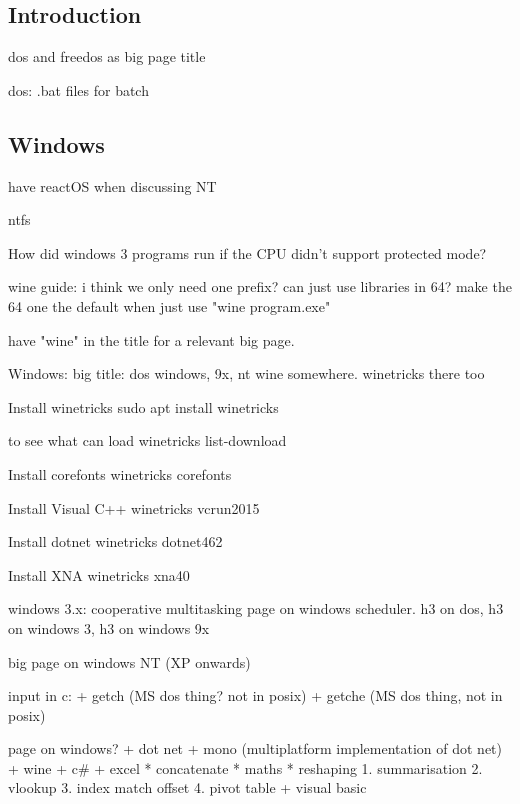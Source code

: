 
\subsection{Introduction}

dos and freedos as big page title

dos: .bat files for batch



\subsection{Windows}

have reactOS when discussing NT

ntfs

How did windows 3 programs run if the CPU didn't support protected mode?

wine guide: i think we only need one prefix? can just use libraries in 64? make the 64 one the default when just use "wine program.exe"

have "wine" in the title for a relevant big page.

Windows: big title: dos windows, 9x, nt
wine somewhere. winetricks there too

Install winetricks
sudo apt install winetricks

to see what can load
winetricks list-download

Install corefonts
winetricks corefonts

Install Visual C++
winetricks vcrun2015

Install dotnet
winetricks dotnet462

Install XNA
winetricks xna40


windows 3.x: cooperative multitasking
page on windows scheduler.
h3 on dos, h3 on windows 3, h3 on windows 9x

big page on windows NT (XP onwards)



input in c:
+ getch (MS dos thing? not in posix)
+ getche (MS dos thing, not in posix)

page on windows?
+ dot net
+ mono (multiplatform implementation of dot net)
+ wine
+ c\#
+ excel
  * concatenate
  * maths
  * reshaping
    1. summarisation
    2. vlookup
    3. index match offset
    4. pivot table
+ visual basic

